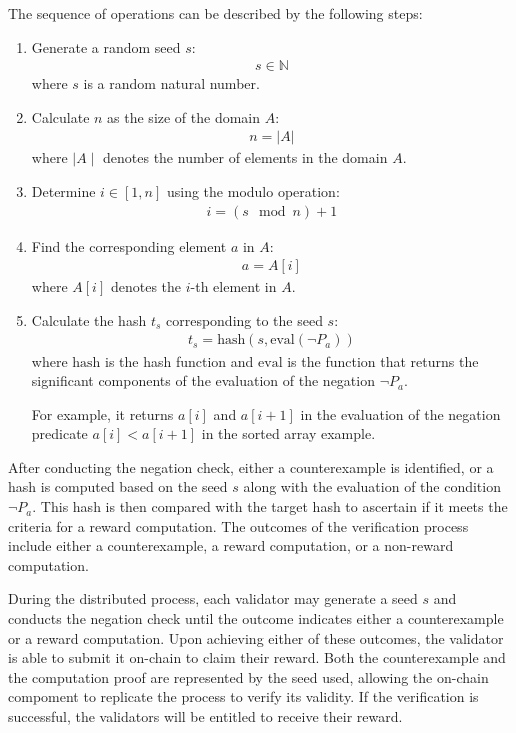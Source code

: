 \documentclass[runningheads]{llncs}
\begin{document}
The sequence of operations can be described by the following steps:
\begin{enumerate}
\item Generate a random seed $s$: 
\begin{align}
s \in \mathbb{N} 
\end{align}
where $s$ is a random natural number.
\item Calculate $n$ as the size of the domain $A$: 
\begin{align}
n = |A|
\end{align}
where $\mid A \mid$ denotes the number of elements in the domain $A$.
\item Determine $i \in [1, n]$ using the modulo operation:
\begin{align}
i = (s \mod n) + 1
\end{align}
\item Find the corresponding element $a$ in $A$:
\begin{align}
a=A[i]
\end{align}
where $A[i]$ denotes the $i$-th element in $A$.
\item Calculate the hash \( t_s \) corresponding to the seed \( s \):
\begin{align}
t_s = \text{hash}(s, \text{eval}(\neg P_{a}))
\end{align}
where \(\text{hash}\) is the hash function and \(\text{eval}\) is the function that returns the significant components of the evaluation of the negation \(\neg P_{a}\). 

For example, it returns \(a[i]\) and \(a[i + 1]\) in the evaluation of the negation predicate \(a[i] < a[i+1]\) in the sorted array example.
\end{enumerate}



After conducting the negation check, either a counterexample is identified, or a hash is computed based on the seed $s$ along with the evaluation of the condition $\neg P_{a}$. This hash is then compared with the target hash to ascertain if it meets the criteria for a reward computation. The outcomes of the verification process include either a counterexample, a reward computation, or a non-reward computation.

During the distributed process, each validator may generate a seed $s$ and conducts the negation check until the outcome indicates either a counterexample or a reward computation. Upon achieving either of these outcomes, the validator is able to submit it on-chain to claim their reward. Both the counterexample and the computation proof are represented by the seed used, allowing the on-chain compoment to replicate the process to verify its validity. If the verification is successful, the validators will be entitled to receive their reward.
 
\end{document}
